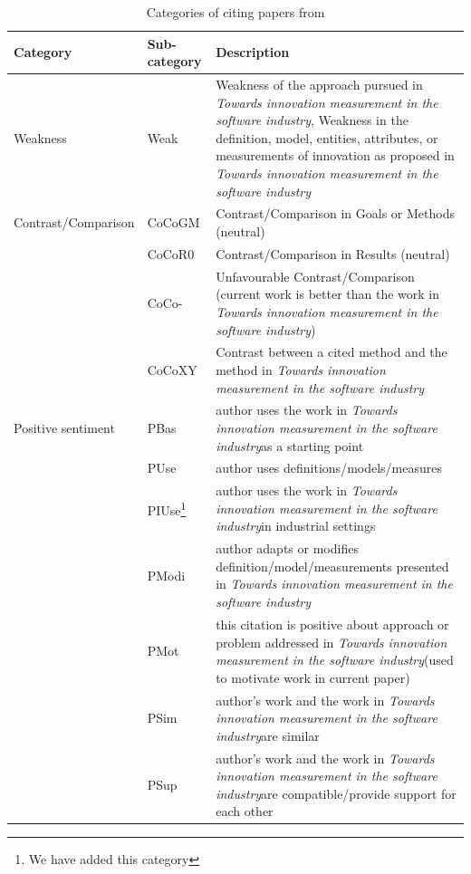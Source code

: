 \documentclass[sigplan]{acmart}
\newcommand{\theArticle}{\textit{Towards innovation measurement in the software industry}}
\begin{document}
\begin{table}
	\caption{Categories of citing papers from \citet{teufel2006annotation}}\label{tab:CitationCategories}
	\begin{tabular}{llp{12cm}}
		\toprule
		\textbf{Category}            & \textbf{Sub-category }& \textbf{Description}                                                                                                            \\ \midrule
		Weakness            & Weak         & Weakness of the approach pursued in \theArticle, Weakness in the definition, model, entities, attributes, or measurements of innovation as proposed in \theArticle                                                                                              \\
		\midrule
		Contrast/Comparison & CoCoGM       & Contrast/Comparison in Goals or Methods (neutral)                                                                    \\
		& CoCoR0       & Contrast/Comparison in Results (neutral)                                                                               \\
		& CoCo-        & Unfavourable Contrast/Comparison (current work is better than the work in \theArticle)                                            \\
		& CoCoXY       & Contrast between a cited method and the method in \theArticle                                                                                     \\
		
		\midrule
		Positive sentiment  & PBas         & author uses the work in \theArticle as a starting point                                                                               \\
		& PUse         & author uses definitions/models/measures                                                                                      \\
		& PIUse\footnote{We have added this category}         & author uses the work in \theArticle in industrial settings \\
		& PModi        & author adapts or modifies definition/model/measurements  presented in \theArticle                                                                            \\
		& PMot         & this citation is positive about approach or problem addressed in \theArticle (used to motivate work in current paper)                 \\
		& PSim         & author’s work and the work in \theArticle are similar                                                                               \\
		& PSup         & author’s work and the work in \theArticle are compatible/provide support for each other                                           \\
		

\end{tabular}
\end{table}
\end{document}
